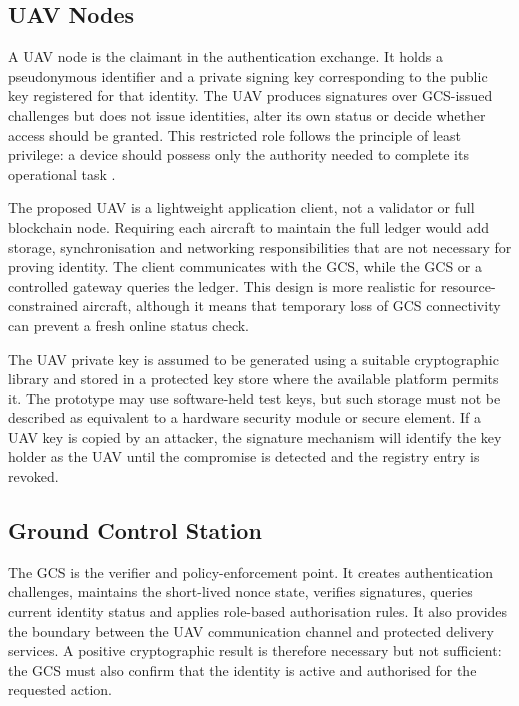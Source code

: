 \subsection{UAV Nodes}
\label{subsec:uav-nodes}

A UAV node is the claimant in the authentication exchange. It holds a pseudonymous identifier and a private signing key corresponding to the public key registered for that identity. The UAV produces signatures over GCS-issued challenges but does not issue identities, alter its own status or decide whether access should be granted. This restricted role follows the principle of least privilege: a device should possess only the authority needed to complete its operational task \cite{SaltzerSchroeder1975}.

The proposed UAV is a lightweight application client, not a validator or full blockchain node. Requiring each aircraft to maintain the full ledger would add storage, synchronisation and networking responsibilities that are not necessary for proving identity. The client communicates with the GCS, while the GCS or a controlled gateway queries the ledger. This design is more realistic for resource-constrained aircraft, although it means that temporary loss of GCS connectivity can prevent a fresh online status check.

The UAV private key is assumed to be generated using a suitable cryptographic library and stored in a protected key store where the available platform permits it. The prototype may use software-held test keys, but such storage must not be described as equivalent to a hardware security module or secure element. If a UAV key is copied by an attacker, the signature mechanism will identify the key holder as the UAV until the compromise is detected and the registry entry is revoked.

\subsection{Ground Control Station}
\label{subsec:gcs}

The GCS is the verifier and policy-enforcement point. It creates authentication challenges, maintains the short-lived nonce state, verifies signatures, queries current identity status and applies role-based authorisation rules. It also provides the boundary between the UAV communication channel and protected delivery services. A positive cryptographic result is therefore necessary but not sufficient: the GCS must also confirm that the identity is active and authorised for the requested action.

